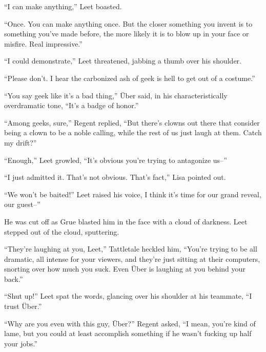 ``I can make anything,'' Leet boasted.



``Once.  You can make anything once.  But the closer something you invent is to something you've made before, the more likely it is to blow up in your face or misfire.  Real impressive.''



``I could demonstrate,'' Leet threatened, jabbing a thumb over his shoulder.



``Please don't.  I hear the carbonized ash of geek is hell to get out of a costume.''



``You say geek like it's a bad thing,'' \"{U}ber said, in his characteristically overdramatic tone, ``It's a badge of honor.''



``Among geeks, sure,'' Regent replied, ``But there's clowns out there that consider being a clown to be a noble calling, while the rest of us just laugh at them.  Catch my drift?''



``Enough,'' Leet growled, ``It's obvious you're trying to antagonize us--''



``I just admitted it.  That's not obvious.  That's fact,'' Lisa pointed out.



``We won't be baited!'' Leet raised his voice, I think it's time for our grand reveal, our guest--''



He was cut off as Grue blasted him in the face with a cloud of darkness.  Leet stepped out of the cloud, sputtering.



``They're laughing at you, Leet,'' Tattletale heckled him, ``You're trying to be all dramatic, all intense for your viewers, and they're just sitting at their computers, snorting over how much you suck.  Even \"{U}ber is laughing at you behind your back.''



``Shut up!'' Leet spat the words, glancing over his shoulder at his teammate, ``I trust \"{U}ber.''



``Why are you even with this guy, \"{U}ber?'' Regent asked, ``I mean, you're kind of lame, but you could at least accomplish something if he wasn't fucking up half your jobs.''




